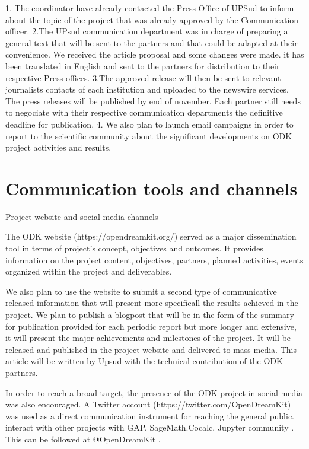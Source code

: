 \documentclass{deliverablereport}
\begin{document}
 1. The coordinator have already contacted the Press Office of UPSud to inform about the topic
 of the project that was already approved by the Communication officer. 
 2.The UPsud communication department was in charge of preparing a general text that will be sent
 to the partners and that could be adapted at their convenience. We received the article proposal 
 and some changes were made. it has been translated in English and sent to the partners 
 for distribution to their respective Press offices. 
 3.The approved release will then be sent to relevant journalists contacts of each institution 
 and uploaded to the newswire services. The press releases will be published by end of november. 
 Each partner still needs to negociate with their respective communication departments the 
 definitive deadline for publication.
 4. We also plan to launch email campaigns in order to report to the scientific community
 about the significant developments on ODK project activities and results. 


\section{Communication tools and channels}

\Subsection Project website and social media channels

The ODK website (https://opendreamkit.org/) served as a major dissemination tool in terms of 
project’s concept, objectives and outcomes. It provides information on the project content,
objectives,  partners,  planned activities, events organized within the project and deliverables.

We also plan to use the website to submit a second type of communicative released 
information that will present more specificall the results achieved in the project.
We plan to publish a blogpost that will be in the form of the summary for publication
provided for each periodic report but more longer and  extensive, it will present the 
major achievements and milestones of the project. It will be released and published in 
the project website and delivered to mass media. This article will be written by Upsud 
with the technical contribution of the ODK partners. 
 
In order to reach a broad target, the presence of the ODK project in social media was
also encouraged. A Twitter account (https://twitter.com/OpenDreamKit) was used as a 
direct communication instrument for reaching the general public. interact with other 
projects with GAP, SageMath.Cocalc, Jupyter community . This can be followed at @OpenDreamKit . 
\end{document}
